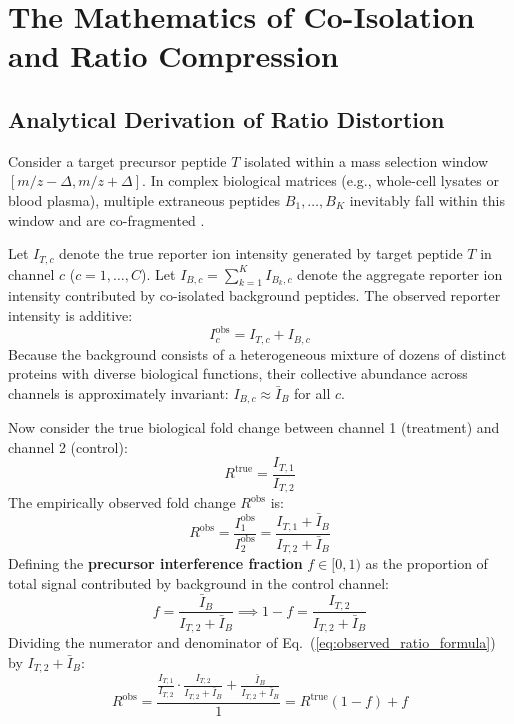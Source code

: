 \documentclass[11pt,oneside]{book}
\begin{document}
\section{The Mathematics of Co-Isolation and Ratio Compression}

\subsection{Analytical Derivation of Ratio Distortion}
Consider a target precursor peptide $T$ isolated within a mass selection window $[m/z - \Delta, m/z + \Delta]$. In complex biological matrices (e.g., whole-cell lysates or blood plasma), multiple extraneous peptides $B_1, \dots, B_K$ inevitably fall within this window and are co-fragmented \cite{ting2011sps}.

Let $I_{T,c}$ denote the true reporter ion intensity generated by target peptide $T$ in channel $c$ ($c = 1, \dots, C$). Let $I_{B,c} = \sum_{k=1}^K I_{B_k,c}$ denote the aggregate reporter ion intensity contributed by co-isolated background peptides. The observed reporter intensity is additive:
\begin{equation}
I_c^{\text{obs}} = I_{T,c} + I_{B,c}
\label{eq:observed_intensity}
\end{equation}
Because the background consists of a heterogeneous mixture of dozens of distinct proteins with diverse biological functions, their collective abundance across channels is approximately invariant: $I_{B,c} \approx \bar{I}_B$ for all $c$.

Now consider the true biological fold change between channel 1 (treatment) and channel 2 (control):
\begin{equation}
R^{\text{true}} = \frac{I_{T,1}}{I_{T,2}}
\end{equation}
The empirically observed fold change $R^{\text{obs}}$ is:
\begin{equation}
R^{\text{obs}} = \frac{I_{1}^{\text{obs}}}{I_{2}^{\text{obs}}} = \frac{I_{T,1} + \bar{I}_B}{I_{T,2} + \bar{I}_B}
\label{eq:observed_ratio_formula}
\end{equation}
Defining the \textbf{precursor interference fraction} $f \in [0, 1)$ as the proportion of total signal contributed by background in the control channel:
\begin{equation}
f = \frac{\bar{I}_B}{I_{T,2} + \bar{I}_B} \implies 1 - f = \frac{I_{T,2}}{I_{T,2} + \bar{I}_B}
\label{eq:interference_fraction}
\end{equation}
Dividing the numerator and denominator of Eq.~(\ref{eq:observed_ratio_formula}) by $I_{T,2} + \bar{I}_B$:
\begin{equation}
R^{\text{obs}} = \frac{\frac{I_{T,1}}{I_{T,2}} \cdot \frac{I_{T,2}}{I_{T,2} + \bar{I}_B} + \frac{\bar{I}_B}{I_{T,2} + \bar{I}_B}}{1} = R^{\text{true}}(1 - f) + f
\label{eq:ratio_compression_linear}
\end{equation}
\end{document}
